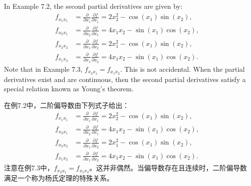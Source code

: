 \begin{original}
In Example 7.2, the second partial derivatives are given by:
\begin{align*}
f_{x_1 x_1} &= \frac{\partial}{\partial x_1}\frac{\partial f}{\partial x_1} = 2 x_2^2 - \cos(x_1) \sin(x_2),\\
f_{x_2 x_1} &= \frac{\partial}{\partial x_2}\frac{\partial f}{\partial x_1} = 4 x_1 x_2 - \sin(x_1) \cos(x_2),\\
f_{x_2 x_2} &= \frac{\partial}{\partial x_1}\frac{\partial f}{\partial x_2} = 2 x_1^2 - \cos(x_1) \sin(x_2),\\
f_{x_1 x_2} &= \frac{\partial}{\partial x_1}\frac{\partial f}{\partial x_2} = 4 x_1 x_2 - \sin(x_1) \cos(x_2).
\end{align*}
Note that in Example 7.3, $f_{x_2 x_1} = f_{x_1 x_2}$. This is not accidental. When the partial derivatives exist and are continuous, then the second partial derivatives satisfy a special relation known as Young's theorem.
\end{original}
\begin{translation}
在例7.2中，二阶偏导数由下列式子给出：
\begin{align*}
f_{x_1 x_1} &= \frac{\partial}{\partial x_1}\frac{\partial f}{\partial x_1} = 2 x_2^2 - \cos(x_1) \sin(x_2),\\
f_{x_2 x_1} &= \frac{\partial}{\partial x_2}\frac{\partial f}{\partial x_1} = 4 x_1 x_2 - \sin(x_1) \cos(x_2),\\
f_{x_2 x_2} &= \frac{\partial}{\partial x_1}\frac{\partial f}{\partial x_2} = 2 x_1^2 - \cos(x_1) \sin(x_2),\\
f_{x_1 x_2} &= \frac{\partial}{\partial x_1}\frac{\partial f}{\partial x_2} = 4 x_1 x_2 - \sin(x_1) \cos(x_2).
\end{align*}
注意在例7.3中，$f_{x_2 x_1} = f_{x_1 x_2}$。这并非偶然。当偏导数存在且连续时，二阶偏导数满足一个称为杨氏定理的特殊关系。
\end{translation}

